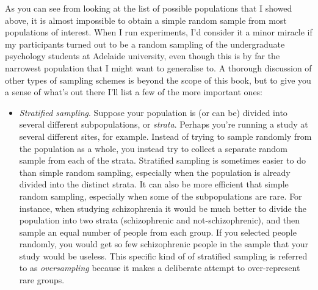 
As you can see from looking at the list of possible populations that I showed above, it is almost impossible to obtain a simple random sample from most populations of interest. When I run experiments, I'd consider it a minor miracle if my participants turned out to be a random sampling of the undergraduate psychology students at Adelaide university, even though this is by far the narrowest population that I might want to generalise to. A thorough discussion of other types of sampling schemes is beyond the scope of this book, but to give you a sense of what's out there I'll list a few of the more important ones:

\begin{itemize} 
\item {\it Stratified sampling}. Suppose your population is (or can be) divided into several different subpopulations, or {\it strata}. Perhaps you're running a study at several different sites, for example. Instead of trying to sample randomly from the population as a whole, you instead try to collect a separate random sample from each of the strata. Stratified sampling is sometimes easier to do than simple random sampling, especially when the population is already divided into the distinct strata. It can also be more efficient that simple random sampling, especially when some of the subpopulations are rare. For instance, when studying schizophrenia it would be much better to divide the population into two  strata (schizophrenic and not-schizophrenic), and then sample an equal number of people from each group. If you selected people randomly, you would get so few schizophrenic people in the sample that your study would be useless. This specific kind of of stratified sampling is referred to as {\it oversampling} because it makes a deliberate attempt to over-represent rare groups. 

\end{itemize}
